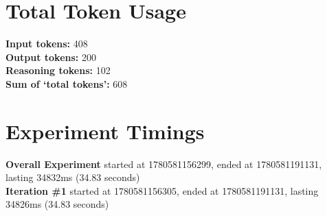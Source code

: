 \documentclass{article}
\begin{document}
\section*{Total Token Usage}
\textbf{Input tokens: }408
\\\textbf{Output tokens: }200
\\\textbf{Reasoning tokens: }102
\\\textbf{Sum of `total tokens': }608
\section*{Experiment Timings}
\textbf{Overall Experiment} started at 1780581156299, ended at 1780581191131, lasting 34832ms (34.83 seconds)
\\\textbf{Iteration \#1} started at 1780581156305, ended at 1780581191131, lasting 34826ms (34.83 seconds)
\end{document}
